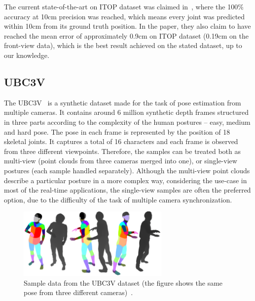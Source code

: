 \noindent
The current state-of-the-art on ITOP dataset was claimed in~\cite{Marin18jvcir}, where the 100\% accuracy at 10cm precision was reached, which means every joint was predicted within 10cm from its ground truth position. In the paper, they also claim to have reached the mean error of approximately 0.9cm on ITOP dataset (0.19cm on the front-view data), which is the best result achieved on the stated dataset, up to our knowledge.

\subsection{UBC3V}

The UBC3V~\cite{Shafaei16} is a synthetic dataset made for the task of pose estimation from multiple cameras. It contains around 6 million synthetic depth frames structured in three parts according to the complexity of the human postures – easy, medium and hard pose. The pose in each frame is represented by the position of 18 skeletal joints. It captures a total of 16 characters and each frame is observed from three different viewpoints. Therefore, the samples can be treated both as multi-view (point clouds from three cameras merged into one), or single-view postures (each sample handled separately). Although the multi-view point clouds describe a particular posture in a more complex way, considering the use-case in most of the real-time applications, the single-view samples are often the preferred option, due to the difficulty of the task of multiple camera synchronization.\par

\vspace{5mm}
\begin{figure}[H]
\begin{center}
  \includegraphics[height=130px]{images/implementation/ubc3v.png}
  \caption[Sample data from the UBC3V dataset.]{Sample data from the UBC3V dataset (the figure shows the same pose from three different cameras)~\cite{Shafaei16}.}
  \label{fig:ubc3v}
\end{center}
\end{figure}

